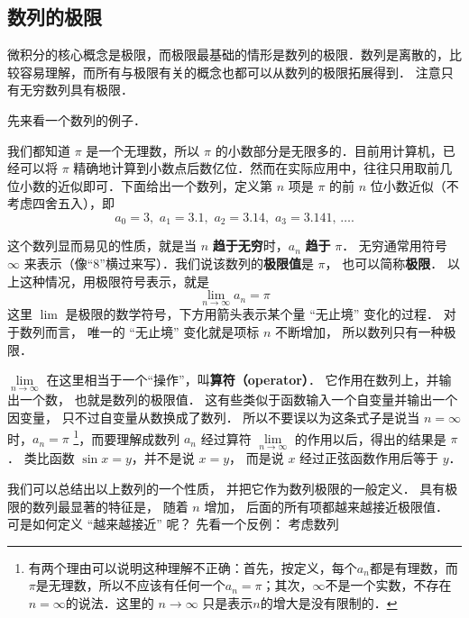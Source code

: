 
\subsection{数列的极限}

微积分的核心概念是极限，而极限最基础的情形是数列的极限．数列是离散的，比较容易理解，而所有与极限有关的概念也都可以从数列的极限拓展得到． 注意只有无穷数列具有极限．

先来看一个数列的例子．

\begin{example}{}\label{Lim_ex1}
我们都知道 $\pi$ 是一个无理数，所以 $\pi$ 的小数部分是无限多的．目前用计算机，已经可以将 $\pi$ 精确地计算到小数点后数亿位．然而在实际应用中，往往只用取前几位小数的近似即可．下面给出一个数列，定义第 $n$ 项是 $\pi$ 的前 $n$ 位小数近似（不考虑四舍五入），即
\begin{equation}
a_0 = 3,\,\, a_1 = 3.1,\,\, a_2 = 3.14,\,\, a_3 = 3.141,\,\dots.
\end{equation}
\end{example}

这个数列显而易见的性质，就是当 $n$ \textbf{趋于无穷}时，$a_n$ \textbf{趋于} $\pi$． 无穷通常用符号 $\infty$ 来表示（像“8”横过来写）．我们说该数列的\textbf{极限值}是 $\pi$， 也可以简称\textbf{极限}． 以上这种情况，用极限符号表示，就是
\begin{equation}
\lim_{n \to \infty } {a_n} = \pi 
\end{equation}
这里 $\lim$ 是极限的数学符号，下方用箭头表示某个量 “无止境” 变化的过程． 对于数列而言， 唯一的 “无止境” 变化就是项标 $n$ 不断增加， 所以数列只有一种极限．



$\lim\limits_{n \to \infty }$ 在这里相当于一个“操作”，叫\textbf{算符（operator）}． 它作用在数列上，并输出一个数， 也就是数列的极限值． 这有些类似于函数输入一个自变量并输出一个因变量， 只不过自变量从数换成了数列． 所以不要误以为这条式子是说当 $n = \infty$ 时，$a_n=\pi$ \footnote{有两个理由可以说明这种理解不正确：首先，按定义，每个$a_n$都是有理数，而$\pi$是无理数，所以不应该有任何一个$a_n=\pi$；其次，$\infty$不是一个实数，不存在$n=\infty$的说法．这里的 $n\to\infty$ 只是表示$n$的增大是没有限制的．}，而要理解成数列 $a_n$ 经过算符 $\lim\limits_{n \to \infty }$ 的作用以后，得出的结果是 $\pi$． 类比函数 $\sin x = y$，并不是说 $x=y$， 而是说 $x$ 经过正弦函数作用后等于 $y$． 

我们可以总结出以上数列的一个性质， 并把它作为数列极限的一般定义． 具有极限的数列最显著的特征是， 随着 $n$ 增加， 后面的所有项都越来越接近极限值． 可是如何定义 “越来越接近” 呢？ 先看一个反例： 考虑数列


